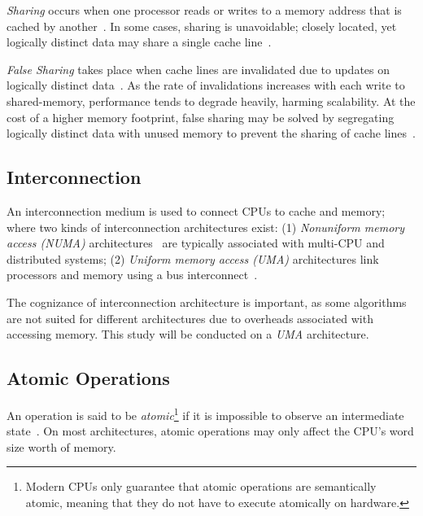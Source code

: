 \emph{Sharing} occurs when one processor reads or writes to a memory address that
is cached by another~\citep[Appendix~B.5.1]{herlihy2020art}. In some cases,
sharing is unavoidable; closely located, yet
logically distinct data may share a single cache
line~\citep[Appendix~B.5.1]{herlihy2020art}. 

\emph{False Sharing} takes place when cache lines are invalidated due to updates
on logically distinct data~\citep[Appendix~B.5.1]{herlihy2020art}. As the
rate of invalidations increases with each write to shared-memory, performance
tends to degrade heavily, harming scalability. At the cost of a higher memory footprint, false
sharing may be solved by segregating logically distinct data with unused memory
to prevent the sharing of cache lines~\citep{scott2013shared}.

\subsection{Interconnection}

An interconnection medium is used to connect CPUs to cache and memory; where
two kinds of interconnection architectures exist: (1)
\emph{Nonuniform memory access (NUMA)}
architectures~\citep[Appendix~B.3]{herlihy2020art} are typically associated with
multi-CPU and distributed systems; (2) \emph{Uniform memory
access (UMA)} architectures link processors and memory using a bus
interconnect~\citep[Appendix~B.3]{herlihy2020art}.

The cognizance of interconnection architecture is important,
as some algorithms are not suited for different architectures due to
overheads associated with accessing memory. This study will be
conducted on a \emph{UMA} architecture.

\subsection{Atomic Operations}
An operation is said to be \emph{atomic}\footnote{Modern CPUs only guarantee
that atomic operations are semantically atomic, meaning that they do not
have to execute atomically on hardware.} if it is impossible to observe an
intermediate state~\citep{perfbook2021}. On most architectures, atomic
operations may only affect the CPU's word size worth of memory.

